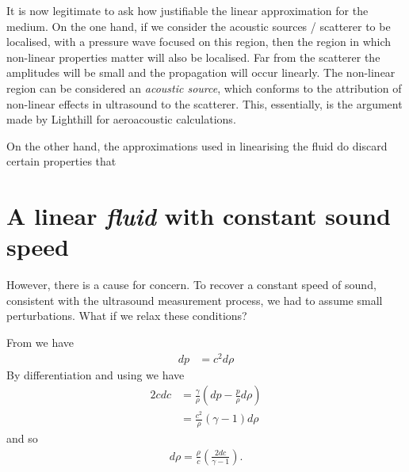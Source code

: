 

It is now legitimate to ask how justifiable the linear approximation for the medium.
On the one hand, if we consider the acoustic sources / scatterer to be localised,
with a pressure wave focused on this region,
then the region in which non-linear properties matter will also be localised.
Far from the scatterer the amplitudes will be small and the propagation will occur linearly.
The non-linear region can be considered an {\em acoustic source}, which conforms to the attribution of non-linear effects in ultrasound to the scatterer.
This, essentially, is the argument made by Lighthill\cite{} for aeroacoustic calculations.




On the other hand, the approximations used in linearising the fluid do discard certain properties that



\section{A linear {\em fluid} with constant sound speed}

However, there is a cause for concern.
To recover a constant speed of sound, consistent with the ultrasound measurement process,
we had to assume small perturbations.
What if we relax these conditions?


From \eqnref{} we have
\begin{align}
  d p &= c^2 d\rho
\end{align}
By differentiation \eqnref{} and using 
we have
\begin{align}
2 c dc &= \frac{\gamma}{\rho} \left(dp - \frac{p}{\rho}d\rho\right)  \\
       &= \frac{c^2}{\rho}\left(\gamma-1\right) d\rho
\end{align}
and so
\begin{align}
d\rho = \frac{\rho}{c}\left(\frac{2dc}{\gamma - 1}\right).
\end{align}

